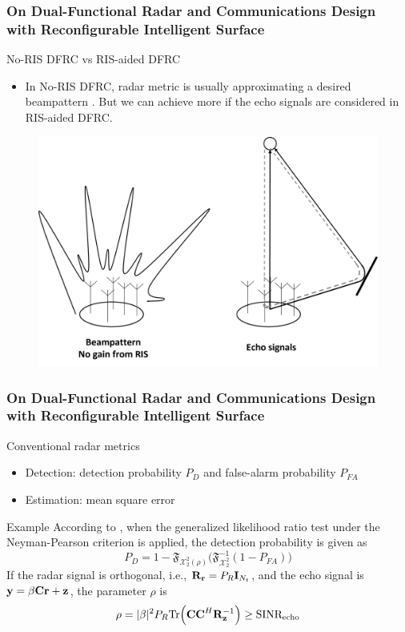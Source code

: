 \begin{frame}
    \frametitle{On Dual-Functional Radar and Communications Design with Reconfigurable Intelligent Surface}
    \begin{block}{No-RIS DFRC vs RIS-aided DFRC}
        \begin{itemize}
        \small
        \item In No-RIS DFRC, radar metric is usually approximating a desired beampattern \cite{liu2018beamforming,liu2020beamforming,xu2020tradeoff}. But we can achieve more if the echo signals are considered in RIS-aided DFRC.
        \end{itemize}    
    \end{block}
    \begin{figure}
        \centering
        \includegraphics[width=0.6\linewidth]{./img/No-RIS_vs_RIS-aided.png}
    \end{figure}
\end{frame}

\begin{frame}
    \frametitle{On Dual-Functional Radar and Communications Design with Reconfigurable Intelligent Surface}
    \begin{block}{Conventional radar metrics}
        \begin{itemize}
        \small
        \item Detection: detection probability $P_D$ and false-alarm probability $P_{FA}$
        \item Estimation: mean square error
        \end{itemize}    
    \end{block}

    \begin{block}{Example}
        \small
        According to \cite{wang2020ris}, when the generalized likelihood ratio test under the
        Neyman-Pearson criterion is applied, the detection probability is given as
        \begin{equation}
            P_D = 1 - \mathfrak{F}_{\mathcal{X}_2^2(\rho)}\Big(\mathfrak{F}_{\mathcal{X}_2^2}^{-1}(1-P_{FA})\Big)
        \end{equation}
        If the radar signal is orthogonal, i.e., ${\bf R_r}=P_R{\bf I}_{N_t}$, and the echo signal is ${\bf y} = \beta{\bf Cr + z}$, 
        the parameter $\rho$ is
        \begin{equation}
            \rho = |\beta|^2 P_R {\rm Tr}\Big( {\bf CC}^H {\bf R}_{\bf z}^{-1} \Big) \geq {\rm SINR_{echo}}
        \end{equation}
    \end{block}
\end{frame}

